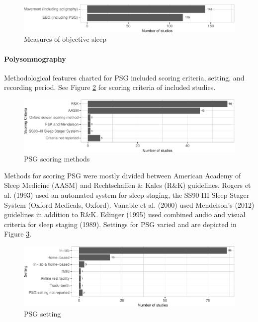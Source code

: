 \documentclass[
]{article}
\begin{document}
\begin{figure}
\centering
\includegraphics{review_markdown_files/figure-latex/measures-1.pdf}
\caption{\label{fig:measures}Measures of objective sleep}
\end{figure}

\paragraph{Polysomnography}\label{polysomnography}

Methodological features charted for PSG included scoring criteria, setting, and recording period. See Figure \ref{fig:scoring} for scoring criteria of included studies.

\begin{figure}
\centering
\includegraphics{review_markdown_files/figure-latex/scoring-1.pdf}
\caption{\label{fig:scoring}PSG scoring methods}
\end{figure}

Methods for scoring PSG were mostly divided between American Academy of Sleep Medicine (AASM) and Rechtschaffen \& Kales (R\&K) guidelines. Rogers et al. (1993) used an automated system for sleep staging, the SS90-III Sleep Stager System (Oxford Medicals, Oxford). Vanable et al. (2000) used Mendelson's (2012) guidelines in addition to R\&K. Edinger (1995) used combined audio and visual criteria for sleep staging (1989). Settings for PSG varied and are depicted in Figure \ref{fig:setting}.

\begin{figure}
\centering
\includegraphics{review_markdown_files/figure-latex/setting-1.pdf}
\caption{\label{fig:setting}PSG setting}
\end{figure}
\end{document}
